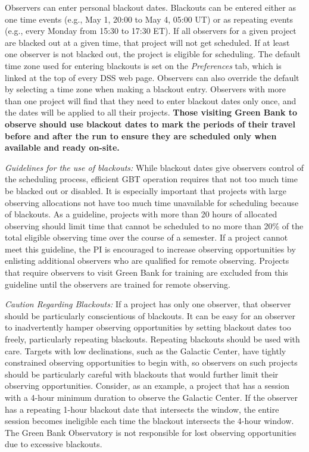 Observers can enter personal blackout dates. Blackouts can be entered either as one time
events (e.g., May 1, 20:00 to May 4, 05:00 UT) or as repeating events (e.g., every
Monday from 15:30 to 17:30 ET). If all observers for a given project are blacked out at a
given time, that project will not get scheduled. If at least one observer is not blacked out,
the project is eligible for scheduling. The default time zone used for entering blackouts is
set on the {\it Preferences} tab, which is linked at the top of every \gls{DSS} web page. Observers
can also override the default by selecting a time zone when making a blackout entry.
Observers with more than one project will find that they need to enter blackout dates only
once, and the dates will be applied to all their projects. {\bf Those visiting Green Bank to
observe should use blackout dates to mark the periods of their travel before and after the
run to ensure they are scheduled only when available and ready on-site.}

{\it Guidelines for the use of blackouts:} While blackout dates give observers control of the
scheduling process, efficient \gls{GBT} operation requires that not too much time be blacked
out or disabled. It is especially important that projects with large observing allocations
not have too much time unavailable for scheduling because of blackouts. As a guideline,
projects with more than 20 hours of allocated observing should limit time that cannot be
scheduled to no more than 20\% of the total eligible observing time over the course of a
semester. If a project cannot meet this guideline, the \gls{PI} is encouraged
to increase observing opportunities by enlisting additional observers who are qualified for
remote observing. Projects that require observers to visit Green Bank for training are excluded
from this guideline until the observers are trained for remote observing.

{\it Caution Regarding Blackouts:} If a project has only one observer, that observer should be
particularly conscientious of blackouts. It can be easy for an observer to inadvertently
hamper observing opportunities by setting blackout dates too freely,
particularly repeating blackouts. Repeating blackouts should be used with care.
Targets with low declinations, such as the Galactic Center, have tightly constrained
observing opportunities to begin with, so observers on such projects
should be particularly careful with blackouts that would further limit their observing
opportunities. Consider, as an example, a project that has a session with a 4-hour
minimum duration to observe the Galactic Center. If the observer has a repeating 1-hour
blackout date that intersects the window, the entire session becomes ineligible each time
the blackout intersects the 4-hour window.  The Green Bank Observatory is not responsible
for lost observing opportunities due to excessive blackouts.

